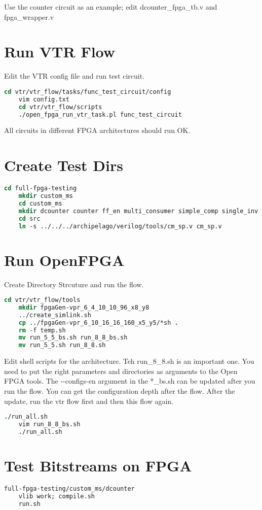 \documentclass[10pt]{article}
\begin{document}
\noindent
Use the counter circuit as an example; edit dcounter\_fpga\_tb.v and fpga\_wrapper.v

\section{Run VTR Flow}

Edit the VTR config file and run test circuit.

\begin{lstlisting}[language=csh]
    cd vtr/vtr_flow/tasks/func_test_circuit/config
    vim config.txt
    cd vtr/vtr_flow/scripts
    ./open_fpga_run_vtr_task.pl func_test_circuit
\end{lstlisting}

\noindent
All circuits in different FPGA architectures should run OK.

\section{Create Test Dirs}

\begin{lstlisting}[language=csh]
    cd full-fpga-testing
    mkdir custom_ms
    cd custom_ms
    mkdir dcounter counter ff_en multi_consumer simple_comp single_inv single_inv_reg src wide_inv wide_inv_reg
    cd src
    ln -s ../../../archipelago/verilog/tools/cm_sp.v cm_sp.v
\end{lstlisting}

\section{Run OpenFPGA}

Create Directory Strcuture and run the flow.

\begin{lstlisting}[language=csh]
    cd vtr/vtr_flow/tools
    mkdir fpgaGen-vpr_6_4_10_10_96_x8_y8
    ../create_simlink.sh
    cp ../fpgaGen-vpr_6_10_16_16_160_x5_y5/*sh .
    rm -f temp.sh
    mv run_5_5_bs.sh run_8_8_bs.sh
    mv run_5_5.sh run_8_8.sh
\end{lstlisting}

\noindent
Edit shell scripts for the architecture. Teh run\_8\_8.sh is an important one. You need to put the right parameters
and directories as arguments to the Open FPGA tools.
The -{}-configs-en argument in the *\_bs.sh can be updated after you run the flow.
You can get the configuration depth after the flow. After the update, run the vtr flow first and then this flow again.

\begin{lstlisting}[language=csh]
    ./run_all.sh
    vim run_8_8_bs.sh
    ./run_all.sh
\end{lstlisting}

\section{Test Bitstreams on FPGA}

\begin{lstlisting}[language=csh]
    full-fpga-testing/custom_ms/dcounter
    vlib work; compile.sh
    run.sh
\end{lstlisting}
\end{document}
